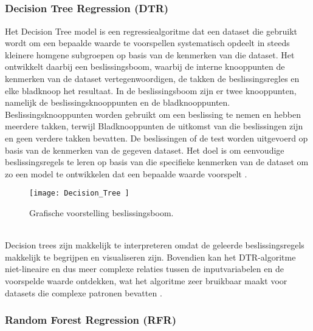 \subsection{}%
\label{sec:supervised machine learning: regressie modellen}

\subsubsection{Decision Tree Regression (DTR)}

Het Decision Tree model is een regressiealgoritme dat een dataset die gebruikt wordt om een bepaalde waarde te voorspellen systematisch opdeelt in steeds kleinere homgene subgroepen op basis van de kenmerken van die dataset. Het ontwikkelt daarbij een beslissingsboom, waarbij de interne knooppunten de kenmerken van de dataset vertegenwoordigen, de takken de beslissingsregles en elke bladknoop het resultaat. In de beslissingsboom zijn er twee knooppunten, namelijk de beslissingsknooppunten en de bladknooppunten. Beslissingsknooppunten worden gebruikt om een beslissing te nemen en hebben meerdere takken, terwijl Bladknooppunten de uitkomst van die beslissingen zijn en geen verdere takken bevatten.
De beslissingen of de test worden uitgevoerd op basis van de kenmerken van de gegeven dataset. Het doel is om eenvoudige beslissingsregels te leren op basis van die specifieke kenmerken van de dataset om zo een model te ontwikkelen dat een bepaalde waarde voorspelt  \autocite{Balakumar2023}.  
\\
\begin{figure}[h!]
    \centering\texttt{[image: Decision\_Tree ]}
    \caption{\label{fig:Decision_Tree}Grafische voorstelling beslissingsboom.}
\end{figure} 
\\

Decision trees zijn makkelijk te interpreteren omdat de geleerde beslissingsregels makkelijk te begrijpen en visualiseren zijn. Bovendien kan het DTR-algoritme niet-lineaire en dus meer complexe relaties tussen de inputvariabelen en de voorspelde waarde ontdekken, wat het algoritme zeer bruikbaar maakt voor datasets die complexe patronen bevatten  \autocite{Viswa2023}. 

\subsubsection{Random Forest Regression (RFR)}

